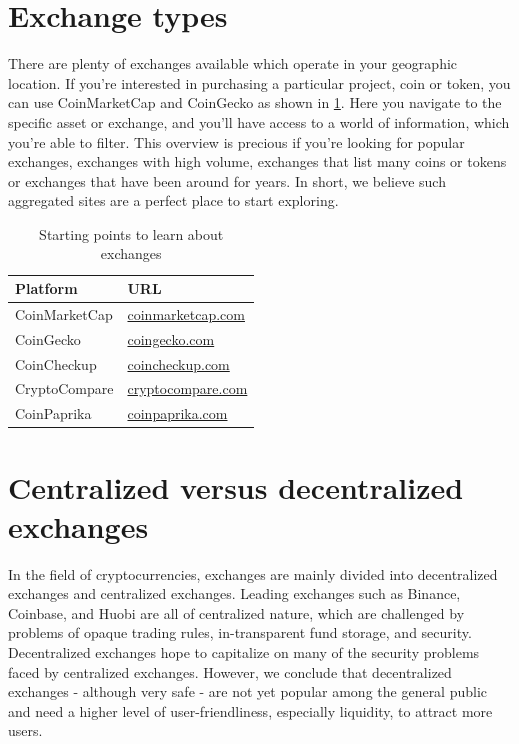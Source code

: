 \section{Exchange types}
\label{sec:exchangetypes}

There are plenty of exchanges available which operate in your geographic location. If you're interested in purchasing a particular project, coin or token, you can use CoinMarketCap and CoinGecko as shown in \cref{tab:exchangeoverview}.
Here you navigate to the specific asset or exchange, and you'll have access to a world of information, which you're able to filter. This overview is precious if you're looking for popular exchanges, exchanges with high volume, exchanges that list many coins or tokens or exchanges that have been around for years. In short, we believe such aggregated sites are a perfect place to start exploring.


\begin{table}

\centering

\caption{Starting points to learn about exchanges}

\begin{tabular}{ll} 
\toprule

\textbf{Platform} & \textbf{URL}\\
\midrule

CoinMarketCap   & \href{https://coinmarketcap.com}{coinmarketcap.com}      \\
CoinGecko       & \href{https://www.coingecko.com/en}{coingecko.com}    \\
CoinCheckup & \href{https://coincheckup.com}{coincheckup.com}    \\
CryptoCompare   & \href{https://www.cryptocompare.com}{cryptocompare.com}  \\
CoinPaprika      & \href{https://coinpaprika.com}{coinpaprika.com}         \\


\bottomrule
\end{tabular}
\label{tab:exchangeoverview}
\end{table}



\section{Centralized versus decentralized exchanges}
\label{sec:centralizedvsdecentralized}

In the field of cryptocurrencies, exchanges are mainly divided into decentralized exchanges and centralized exchanges. Leading exchanges such as Binance, Coinbase, and Huobi are all of centralized nature, which are challenged by problems of opaque trading rules, in-transparent fund storage, and security. Decentralized exchanges hope to capitalize on many of the security problems faced by centralized exchanges. However, we conclude that decentralized exchanges - although very safe - are not yet popular among the general public and need a higher level of user-friendliness, especially liquidity, to attract more users. \medskip


